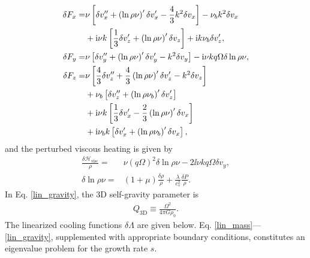 \begin{align}
  \delta F_x =& \nu \left[\delta v_x^{\prime\prime} + 
    \left(\ln{\rho\nu}\right)^\prime \delta v_x^\prime - 
     \frac{4}{3}k^2\delta v_x \right] - \nu_bk^2\delta v_x \notag\\
   &+ \mathrm{i} \nu k \left[\frac{1}{3}\delta v_z^\prime+ 
    \left(\ln{\rho\nu}\right)^\prime\delta v_z\right] + \mathrm{i} k \nu_b
  \delta v_z^\prime,\\
  \delta F_y = & \nu  \left[\delta v_y^{\prime\prime} + 
    \left(\ln{\rho\nu}\right)^\prime \delta v_y^\prime - 
     k^2\delta v_y \right] - \mathrm{i}\nu kq\Omega\delta\ln{\rho\nu},\\
  \delta F_z =& \nu\left[\frac{4}{3}\delta v_z^{\prime\prime} + 
    \frac{4}{3}\left(\ln{\rho\nu}\right)^\prime \delta v_z^\prime - 
    k^2\delta v_z \right] \notag\\
  & +\nu_b\left[\delta v_z^{\prime\prime} + \left(\ln{\rho\nu_b}\right)^\prime\delta v_z^\prime\right]\notag\\
  & + \mathrm{i} \nu k  \left[\frac{1}{3}\delta v_x^\prime -  
    \frac{2}{3}\left(\ln{\rho\nu}\right)^\prime\delta v_x\right]\notag\\
  &+\mathrm{i} \nu_b k \left[\delta v_x^\prime + \left(\ln{\rho\nu_b}\right)^\prime\delta v_x\right],
\end{align}
and the perturbed viscous heating is given by 
\begin{align}
  \frac{\delta\mathcal{H}_\mathrm{visc}}{\rho}=& \nu (q\Omega)^2
  \delta\ln{\rho\nu} - 2\ii\nu k q \Omega \delta v_y,\\
  \delta\ln{\rho\nu} =& (1+\mu)\frac{\delta\rho}{\rho} +
  \frac{\lambda}{c_s^2}\frac{\delta P}{\rho}. \label{linear_beta_cool}
\end{align}
In Eq. \ref{lin_gravity}, the 3D self-gravity parameter is
\begin{align}
  Q_\mathrm{3D} \equiv \frac{\Omega^2}{4\pi G \rho_0}. 
\end{align}
The linearized cooling functions $\delta\Lambda$ are given below. 
Eq. \ref{lin_mass}---\ref{lin_gravity}, supplemented with appropriate
boundary conditions, constitutes an eigenvalue problem for the growth
rate $s$. 

